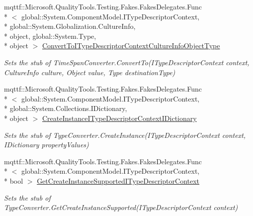 \begin{DoxyCompactItemize}
mqttf\-::\-Microsoft.\-Quality\-Tools.\-Testing.\-Fakes.\-Fakes\-Delegates.\-Func\\*
$<$ global\-::\-System.\-Component\-Model.\-I\-Type\-Descriptor\-Context, \\*
global\-::\-System.\-Globalization.\-Culture\-Info, \\*
object, global\-::\-System.\-Type, \\*
object $>$ \hyperlink{class_system_1_1_component_model_1_1_fakes_1_1_stub_time_span_converter_ab11f414494c46937fe68b519b54aac31}{Convert\-To\-I\-Type\-Descriptor\-Context\-Culture\-Info\-Object\-Type}
\begin{DoxyCompactList}\small\item\em Sets the stub of Time\-Span\-Converter.\-Convert\-To(\-I\-Type\-Descriptor\-Context context, Culture\-Info culture, Object value, Type destination\-Type)\end{DoxyCompactList}\item 
mqttf\-::\-Microsoft.\-Quality\-Tools.\-Testing.\-Fakes.\-Fakes\-Delegates.\-Func\\*
$<$ global\-::\-System.\-Component\-Model.\-I\-Type\-Descriptor\-Context, \\*
global\-::\-System.\-Collections.\-I\-Dictionary, \\*
object $>$ \hyperlink{class_system_1_1_component_model_1_1_fakes_1_1_stub_time_span_converter_a621d7ec8410dfdc6b63ef3b8a3912910}{Create\-Instance\-I\-Type\-Descriptor\-Context\-I\-Dictionary}
\begin{DoxyCompactList}\small\item\em Sets the stub of Type\-Converter.\-Create\-Instance(\-I\-Type\-Descriptor\-Context context, I\-Dictionary property\-Values)\end{DoxyCompactList}\item 
mqttf\-::\-Microsoft.\-Quality\-Tools.\-Testing.\-Fakes.\-Fakes\-Delegates.\-Func\\*
$<$ global\-::\-System.\-Component\-Model.\-I\-Type\-Descriptor\-Context, \\*
bool $>$ \hyperlink{class_system_1_1_component_model_1_1_fakes_1_1_stub_time_span_converter_a707b84bdb57f16f734ab66e678529675}{Get\-Create\-Instance\-Supported\-I\-Type\-Descriptor\-Context}
\begin{DoxyCompactList}\small\item\em Sets the stub of Type\-Converter.\-Get\-Create\-Instance\-Supported(\-I\-Type\-Descriptor\-Context context)\end{DoxyCompactList}\item 

\end{DoxyCompactItemize}
